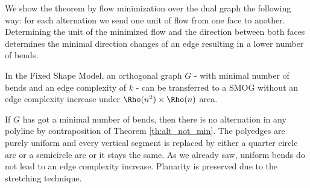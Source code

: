 \begin{sketch}
	We show the theorem by flow minimization over the dual graph the following way: for each alternation we send one unit of flow from one face to another. Determining the unit of the minimized flow and the direction between both faces determines the minimal direction changes of an edge resulting in a lower number of bends.
\end{sketch}
\begin{theorem}
	In the Fixed Shape Model, an orthogonal graph $G$ - with minimal number of bends and an edge complexity of $k$ - can be transferred to a SMOG without an edge complexity increase under $\Rho(n^2) \times \Rho(n)$ area.
\end{theorem}
\begin{sketch}
	If $G$ has got a minimal number of bends, then there is no alternation in any polyline by contraposition of Theorem \ref{th:alt_not_min}. The polyedges are purely uniform and every vertical segment is replaced by either a quarter circle arc or a semicircle arc or it stays the same. As we already saw, uniform bends do not lead to an edge complexity increase. Planarity is preserved due to the stretching technique.
\end{sketch}